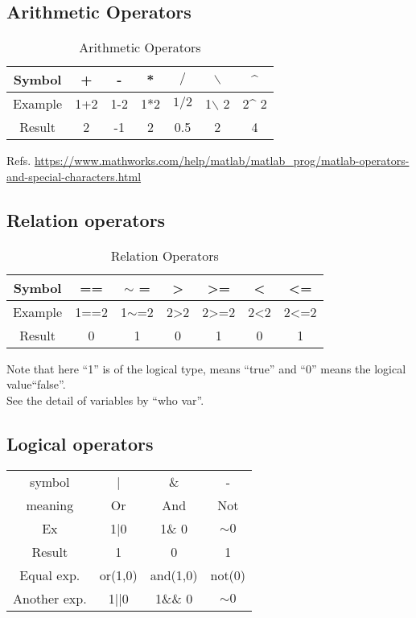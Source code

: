 \documentclass{article}
\begin{document}
\subsection{Arithmetic Operators}
  \begin{table}[H]
    \centering
    \begin{tabular}{ccccccc}\toprule
    Symbol & +&-&*& $/$&$\backslash$&\^{}\\\midrule
     Example&1+2&1-2&1*2&$1/2$&1$\backslash$ 2&2\^{} 2\\\midrule
     Result&2&-1&2&0.5&2&4\\\bottomrule
   \end{tabular}
   \caption{Arithmetic Operators}
   \end{table}
   
Refs. {  \url{https://www.mathworks.com/help/matlab/matlab_prog/matlab-operators-and-special-characters.html}}


\subsection{Relation operators}
   \begin{table}[H]
     \small
     \centering
   \begin{tabular}{ccccccc}\toprule
    Symbol & ==&$\sim$ =&>& >=&<&<=\\\midrule
     Example&1==2&1$\sim$=2&2>2&2>=2& 2<2 &2<=2\\\midrule
     Result&0&1&0&1&0&1\\\bottomrule
   \end{tabular}
   \caption{Relation Operators}
 \end{table}
 Note that here ``1'' is of the logical type, means ``true'' and ``0'' means the logical value``false''.\\
 See the detail of variables by ``{\color{blue}who var}''.

\subsection{Logical operators}
  \begin{table}[H]
    \centering
    \begin{tabular}{cccc}\toprule
      symbol & |&\& &-\\
      meaning & Or & And& Not\\
      Ex& 1|0& 1\& 0 &$\sim 0$ \\
      Result& 1& 0& 1\\
      Equal exp.& or(1,0)&and(1,0)&not(0)\\
      Another exp.& 1||0& 1\&\& 0& $\sim 0$\\\bottomrule
    \end{tabular}
  \end{table}
\end{document}
